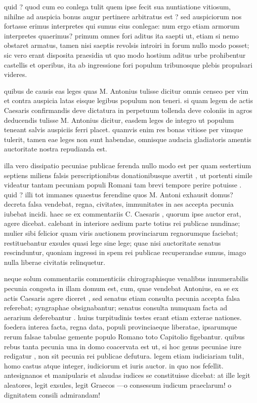  quid ? quod cum eo conlega tulit quem ipse fecit sua nuntiatione vitiosum, nihilne ad auspicia bonus augur pertinere arbitratus est ? sed auspiciorum nos fortasse erimus interpretes qui sumus eius conlegae: num ergo etiam armorum interpretes quaerimus? primum omnes fori aditus ita saepti ut, etiam si nemo obstaret armatus, tamen nisi saeptis revolsis introiri in forum nullo modo posset; sic vero erant disposita praesidia ut quo modo hostium aditus urbe prohibentur castellis et operibus, ita ab ingressione fori populum tribunosque plebis propulsari videres.

 quibus de causis eas leges quas M. Antonius tulisse dicitur omnis censeo per vim et contra auspicia latas eisque legibus populum non teneri. si quam legem de actis Caesaris confirmandis deve dictatura in perpetuum tollenda deve coloniis in agros deducendis tulisse M. Antonius dicitur, easdem leges de integro ut populum teneant salvis auspiciis ferri placet. quamvis enim res bonas vitiose per vimque tulerit, tamen eae leges non sunt habendae, omnisque audacia gladiatoris amentis auctoritate nostra repudianda est.

 illa vero dissipatio pecuniae publicae ferenda nullo modo est per quam sestertium septiens miliens falsis perscriptionibus donationibusque avertit , ut portenti simile videatur tantam pecuniam populi Romani tam brevi tempore perire potuisse . quid ? illi tot immanes quaestus ferendine quos M. Antoni exhausit domus? decreta falsa vendebat, regna, civitates, immunitates in aes accepta pecunia iubebat incidi. haec se ex commentariis C. Caesaris , quorum ipse auctor erat, agere dicebat. calebant in interiore aedium parte totius rei publicae nundinae; mulier sibi felicior quam viris auctionem provinciarum regnorumque faciebat; restituebantur exsules quasi lege sine lege; quae nisi auctoritate senatus rescinduntur, quoniam ingressi in spem rei publicae recuperandae sumus, imago nulla liberae civitatis relinquetur.

 neque solum commentariis commenticiis chirographisque venalibus innumerabilis pecunia congesta in illam domum est, cum, quae vendebat Antonius, ea se ex actis Caesaris agere diceret , sed senatus etiam consulta pecunia accepta falsa referebat; syngraphae obsignabantur; senatus consulta numquam facta ad aerarium deferebantur . huius turpitudinis testes erant etiam exterae nationes. foedera interea facta, regna data, populi provinciaeque liberatae, ipsarumque rerum falsae tabulae gemente populo Romano toto Capitolio figebantur. quibus rebus tanta pecunia una in domo coacervata est ut, si hoc genus pecuniae iure redigatur , non sit pecunia rei publicae defutura. legem etiam iudiciariam tulit, homo castus atque integer, iudiciorum et iuris auctor. in quo nos fefellit. antesignanos et manipularis et alaudas iudices se constituisse dicebat: at ille legit aleatores, legit exsules, legit Graecos —o consessum iudicum praeclarum! o dignitatem consili admirandam!

